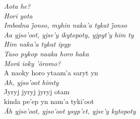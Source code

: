 \begin{linenumbers}\begingroup\raggedright

\noindent   \emph{Aota he?}\\
  \emph{Hori yota}\\
  \emph{Imbodna j̃onso, myhin naka’a tykat j̃onso}\\
  \emph{Aa yjso'oot, yjse'y ikytopoty, yjpyt'y him ty}\\
  \emph{Him naka'a tykat ipyp}\\
  \emph{Taso pykop naaka horo haka}\\
  \emph{Morã ioky 'õromo?}\\
  A naoky horo ytaam'a saryt yn\\
  \emph{Ah, yjso'oot himty}\\
  Jyryj jyryj jyryj otam\\
  kinda pe'ep yn nam'a tyki'oot\\
  \emph{Ãh yjso'oot, yjso'oot ysyp'et, yjse'y kytopoty}

\end{linenumbers}\endgroup

\bigskip


